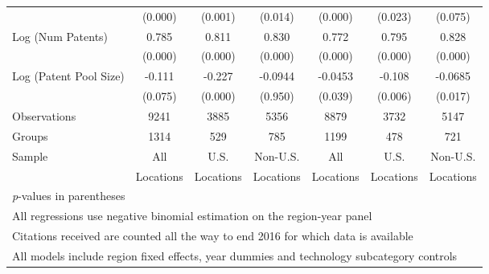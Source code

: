 \documentclass[12pt,letterpaper]{article}
\begin{document}
\begin{table}[htbp]
\begin{tabular}{l*{6}{c}}
                &   (0.000)         &  (0.001)         &  (0.014)&   (0.000)         &  (0.023)         &  (0.075) \\
Log (Num Patents)&     0.785&    0.811&    0.830&        0.772&    0.795&    0.828\\
                &  (0.000)         &  (0.000)         &  (0.000)&  (0.000)&  (0.000)&  (0.000)\\
Log (Patent Pool Size)&  -0.111&   -0.227&  -0.0944&    -0.0453  &   -0.108 &  -0.0685\\
                &  (0.075)&  (0.000)&  (0.950)&   (0.039)         &  (0.006)         &  (0.017) \\
\hline
Observations    &    9241&3885&5356&          8879         &     3732         &     5147\\
Groups          &     1314&529&785&1199         &      478         &      721\\
Sample&All &U.S. &Non-U.S.&All &U.S. &Non-U.S. \\
          &Locations &Locations&Locations&Locations &Locations&Locations \\
\hline\hline
\multicolumn{7}{l}{\footnotesize \textit{p}-values in parentheses}\\
\multicolumn{7}{l}{\footnotesize All regressions use negative binomial estimation on the region-year panel}\\
\multicolumn{7}{l}{\footnotesize * Citations received are counted all the way to end 2016 for which data is available}\\
\multicolumn{7}{l}{\footnotesize All models include region fixed effects, year dummies and technology subcategory controls}\\
\end{tabular}
\end{table}
\end{document}
